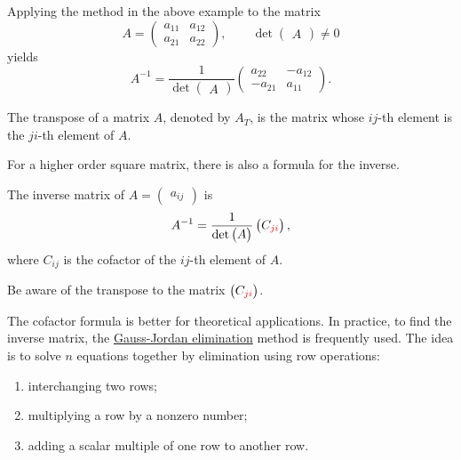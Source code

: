 Applying the method in the above example to the matrix
\[
  A=\begin{pmatrix}
  a_{11} & a_{12}\\
  a_{21} & a_{22}
\end{pmatrix}, \qquad \det\begin{pmatrix}
  A
\end{pmatrix}\ne 0\]
yields
\[
  A^{-1}=\frac{1}{\det\begin{pmatrix}
    A
  \end{pmatrix}}
  \begin{pmatrix}
    a_{22} & -a_{12}\\
    -a_{21} & a_{11}
  \end{pmatrix}.
\]

The transpose of a matrix $A$, denoted by $A_T$, is the matrix whose $ij$-th element is the $ji$-th element of $A$.

For a higher order square matrix, there is also a formula for the inverse.

\begin{theorem}
  The inverse matrix of $A=\begin{pmatrix} a_{ij} \end{pmatrix}$ 
  is
  \[
    A^{-1}=\frac{1}{\det\begin{pmatrix}
    A
  \end{pmatrix}}\begin{pmatrix}
    C_{{\color{red}{ji}}}
  \end{pmatrix},
  \]
  where $C_{ij}$ is the cofactor of the $ij$-th element of $A$.
\end{theorem}

Be aware of the transpose to the matrix $\begin{pmatrix} C_{{\color{red}{ji}}} \end{pmatrix}$.

The cofactor formula is better for theoretical applications. 
In practice, to find the inverse matrix, the \href{https://en.wikipedia.org/wiki/Gaussian_elimination}{Gauss-Jordan elimination} method is frequently used. The idea is to solve $n$ equations together by elimination using row operations:
\begin{enumerate}
  \item interchanging two rows;
  \item multiplying a row by a nonzero number;
  \item adding a scalar multiple of one row to another row.
\end{enumerate}

